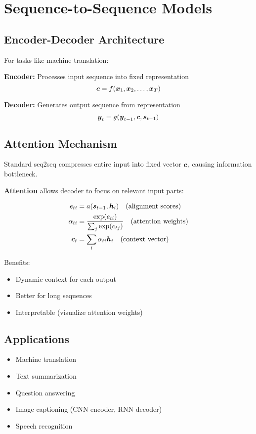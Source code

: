 
\section{Sequence-to-Sequence Models}
\label{sec:seq2seq}

\subsection{Encoder-Decoder Architecture}

For tasks like machine translation:

\textbf{Encoder:} Processes input sequence into fixed representation
\begin{equation}
\boldsymbol{c} = f(\boldsymbol{x}_1, \boldsymbol{x}_2, \ldots, \boldsymbol{x}_T)
\end{equation}

\textbf{Decoder:} Generates output sequence from representation
\begin{equation}
\boldsymbol{y}_t = g(\boldsymbol{y}_{t-1}, \boldsymbol{c}, \boldsymbol{s}_{t-1})
\end{equation}

\subsection{Attention Mechanism}

Standard seq2seq compresses entire input into fixed vector $\boldsymbol{c}$, causing information bottleneck.

\textbf{Attention} allows decoder to focus on relevant input parts:

\begin{align}
e_{ti} &= a(\boldsymbol{s}_{t-1}, \boldsymbol{h}_i) \quad \text{(alignment scores)} \\
\alpha_{ti} &= \frac{\exp(e_{ti})}{\sum_j \exp(e_{tj})} \quad \text{(attention weights)} \\
\boldsymbol{c}_t &= \sum_i \alpha_{ti} \boldsymbol{h}_i \quad \text{(context vector)}
\end{align}

Benefits:
\begin{itemize}
    \item Dynamic context for each output
    \item Better for long sequences
    \item Interpretable (visualize attention weights)
\end{itemize}

\subsection{Applications}

\begin{itemize}
    \item Machine translation
    \item Text summarization
    \item Question answering
    \item Image captioning (CNN encoder, RNN decoder)
    \item Speech recognition
\end{itemize}


